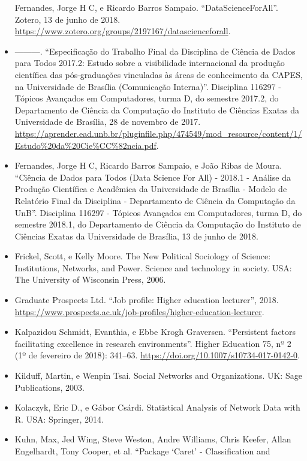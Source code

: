 \documentclass[]{article}
\begin{document}
\begin{itemize}
  Fernandes, Jorge H C, e Ricardo Barros Sampaio. ``DataScienceForAll''.
  Zotero, 13 de junho de 2018.
  \url{https://www.zotero.org/groups/2197167/datascienceforall}.
\item
  ---------. ``Especificação do Trabalho Final da Disciplina de Ciência
  de Dados para Todos 2017.2: Estudo sobre a visibilidade internacional
  da produção científica das pós-graduações vinculadas às áreas de
  conhecimento da CAPES, na Universidade de Brasília (Comunicação
  Interna)''. Disciplina 116297 - Tópicos Avançados em Computadores,
  turma D, do semestre 2017.2, do Departamento de Ciência da Computação
  do Instituto de Ciências Exatas da Universidade de Brasília, 28 de
  novembro de 2017.
  \url{https://aprender.ead.unb.br/pluginfile.php/474549/mod_resource/content/1/Estudo\%20da\%20Cie\%CC\%82ncia.pdf}.
\item
  Fernandes, Jorge H C, Ricardo Barros Sampaio, e João Ribas de Moura.
  ``Ciência de Dados para Todos (Data Science For All) - 2018.1 -
  Análise da Produção Científica e Acadêmica da Universidade de Brasília
  - Modelo de Relatório Final da Disciplina - Departamento de Ciência da
  Computação da UnB''. Disciplina 116297 - Tópicos Avançados em
  Computadores, turma D, do semestre 2018.1, do Departamento de Ciência
  da Computação do Instituto de Ciências Exatas da Universidade de
  Brasília, 13 de junho de 2018.
\item
  Frickel, Scott, e Kelly Moore. The New Political Sociology of Science:
  Institutions, Networks, and Power. Science and technology in society.
  USA: The University of Wisconsin Press, 2006.
\item
  Graduate Prospects Ltd. ``Job profile: Higher education lecturer'',
  2018.
  \url{https://www.prospects.ac.uk/job-profiles/higher-education-lecturer}.
\item
  Kalpazidou Schmidt, Evanthia, e Ebbe Krogh Graversen. ``Persistent
  factors facilitating excellence in research environments''. Higher
  Education 75, nº 2 (1º de fevereiro de 2018): 341--63.
  \url{https://doi.org/10.1007/s10734-017-0142-0}.
\item
  Kilduff, Martin, e Wenpin Tsai. Social Networks and Organizations. UK:
  Sage Publications, 2003.
\item
  Kolaczyk, Eric D., e Gábor Csárdi. Statistical Analysis of Network
  Data with R. USA: Springer, 2014.
\item
  Kuhn, Max, Jed Wing, Steve Weston, Andre Williams, Chris Keefer, Allan
  Engelhardt, Tony Cooper, et al. ``Package `Caret' - Classification and

\end{itemize}
\end{document}
